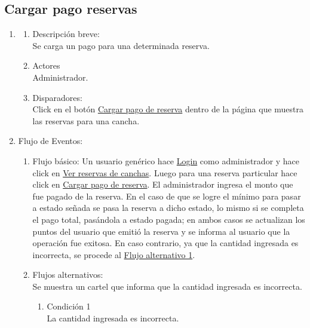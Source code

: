 \documentclass[a4paper,11pt]{article}
\begin{document}
\subsection{Cargar pago reservas}
\begin{enumerate}

    \item
    \begin{enumerate}
    \item Descripción breve: \\
        Se carga un pago para una determinada reserva.
    \item Actores \\
        Administrador.
    \item Disparadores: \\
        Click en el botón \underline{Cargar pago de reserva} dentro de la
        página que muestra las reservas para una cancha.
    \end{enumerate}

    \item Flujo de Eventos: 

    \begin{enumerate}

        \item Flujo básico:
            Un usuario genérico hace \underline{Login} como administrador y
            hace click en \underline{Ver reservas de canchas}. Luego para una
            reserva particular hace click en
            \underline{Cargar pago de reserva}. El administrador ingresa el
            monto que fue pagado de la reserva. En el caso de que se logre el
            mínimo para pasar a estado señada se pasa la reserva a dicho
            estado, lo mismo si se completa el pago total, pasándola a estado
            pagada; en ambos casos se actualizan los puntos del usuario que
            emitió la reserva y se informa al usuario que la operación fue
            exitosa. En caso contrario, ya que la cantidad ingresada es
            incorrecta, se procede al \underline{Flujo alternativo 1}.


        \item Flujos alternativos:\\
            Se muestra un cartel que informa que la cantidad ingresada es
            incorrecta.
            \begin{enumerate}
                \item Condición 1 \\
                    La cantidad ingresada es incorrecta.
            \end{enumerate}


\end{enumerate}
\end{enumerate}
\end{document}
